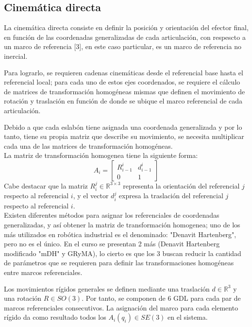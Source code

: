 \subsection{Cinemática directa}

    \noindent La cinemática directa consiste en definir la posición y orientación del efector final, en función de las
    coordenadas generalizadas de cada articulación, con respescto a un marco de referencia [3], en este caso particular,
    es un marco de referencia no inercial.

    Para lograrlo, se requieren cadenas cinemáticas desde el referencial base hasta el referencial local; para cada uno de
    estos ejes coordenados, se requiere el cálculo de matrices de transformación homogéneas mismas que definen el movimiento
    de rotación y traslación en función de donde se ubique el marco referencial de cada articulación. 

    Debido a que cada eslabón tiene asignada una coordenada generalizada y por lo tanto, tiene su propia matriz que describe
    su movimiento, se necesita multiplicar cada una de las matrices de transformación homogéneas.
    \\
    La matriz de transformación homogenea tiene la siguiente forma:
    \begin{equation*} A_i = 
        \begin{bmatrix}
        R^i_{i-1} & d^i_{i-1}\\
        0 & 1
        \end{bmatrix}
    \end{equation*}
    \noindent Cabe destacar que la matriz $R^j_i \in \mathbb{R}^{3\times 3}$ representa la orientación del referencial $j$
    respecto al referencial $i$, y el vector $d^j_{i}$ expresa la traslación del referencial $j$ respecto al referencial $i$.\\

    \noindent Existen diferentes métodos para asignar los referenciales de coordenadas generalizadas, y así obtener la matriz
    de transformación homogenea; uno de los más utilizados en robótica industrial es el denominado: "Denavit Hartenberg",
    pero no es el único. En el curso se presentan 2 más (Denavit Hartenberg modificado "mDH" y GRyMA), lo cierto es que los
    3 buscan reducir la cantidad de parámetros que se requieren para definir las transformaciones homogéneas entre marcos
    referenciales. 

    \noindent Los movimientos rígidos generales se definen mediante una traslación $d \in \mathbb{R}^3$ y una rotación
    $R \in SO(3)$. Por tanto, se componen de 6 GDL para cada par de marcos referenciales consecutivos. La asignación del marco
    para cada elemento rígido da como resultado todos los $A_i (q_i) \in SE(3)$ en el sistema.

